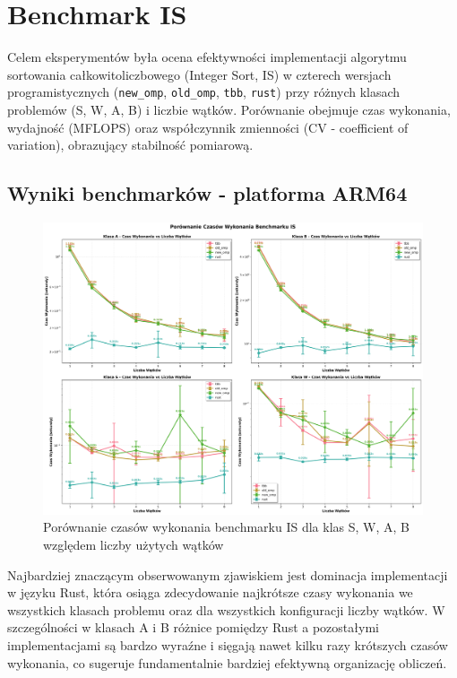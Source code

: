 
\section{Benchmark IS}
Celem eksperymentów była ocena efektywności implementacji algorytmu sortowania całkowitoliczbowego (Integer Sort, IS) w czterech wersjach programistycznych (\texttt{new\_omp}, \texttt{old\_omp}, \texttt{tbb}, \texttt{rust}) przy różnych klasach problemów (S, W, A, B) i liczbie wątków. Porównanie obejmuje czas wykonania, wydajność (MFLOPS) oraz współczynnik zmienności (CV - coefficient of variation), obrazujący stabilność pomiarową.

\subsection{Wyniki benchmarków - platforma ARM64}
\begin{figure}[H]
    \centering
    \includegraphics[width=\textwidth]{analiza/images/parallel/is/arm/is_porownanie_czasow_wykonania.png}
    \caption{Porównanie czasów wykonania benchmarku IS dla klas S, W, A, B względem liczby użytych wątków}
    \label{is_porownanie_czasow_wykonania}
\end{figure}

Najbardziej znaczącym obserwowanym zjawiskiem jest dominacja implementacji w języku Rust, która osiąga zdecydowanie najkrótsze czasy wykonania we wszystkich klasach problemu oraz dla wszystkich konfiguracji liczby wątków. W szczególności w klasach A i B różnice pomiędzy Rust a pozostałymi implementacjami są bardzo wyraźne i sięgają nawet kilku razy krótszych czasów wykonania, co sugeruje fundamentalnie bardziej efektywną organizację obliczeń.

